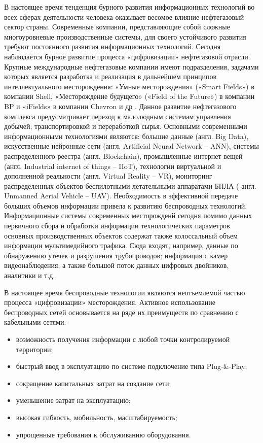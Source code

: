 
{\actuality} 
В настоящее время тенденция бурного развития информационных технологий во всех сферах деятельности человека оказывает весомое влияние нефтегазовый сектор страны. Современные компании, представляющие собой сложные многоуровневые производственные системы, для своего устойчивого развития требуют постоянного развития информационных технологий.  Сегодня наблюдается  бурное развитие процесса «цифровизации» нефтегазовой отрасли. Крупные международные нефтегазовые компании имеют подразделения, задачами которых является разработка и реализация в дальнейшем принципов интеллектуального месторождения: «Умные месторождения» («Smart Fields») в компании Shell, «Месторождение будущего» («Field of the Future») в компании BP и «iFields» в компании Chevron и др \cite{Tcharo2018}. Данное развитие нефтегазового комплекса предусматривает переход к малолюдным системам управления добычей, транспортировкой и переработкой сырья. Основными современными информационными технологиями являются: большие данные (англ. Big Data), искусственные нейронные сети (англ. Artificial Neural Network – ANN), системы распределенного реестра (англ. Blockchain), промышленные интернет вещей (англ. Industrial internet of things – IIoT), технологии виртуальной и дополненной реальности (англ. Virtual Reality – VR), мониторинг распределенных объектов беспилотными летательными аппаратами БПЛА ( англ. Unmanned Aerial Vehicle – UAV). Необходимость в эффективной передаче больших объемов информации привела к развитию беспроводных технологий. Информационные  системы современных месторожденй сегодня помимо данных первичного сбора и обработки информации технологических параметров основных производственных объектов содержат также колоссальный объем информации мультимедийного трафика. Сюда входят, например, данные по обнаружению утечек и разрушения трубопроводов; информация с камер видеонаблюдения; а также большой поток данных цифровых двойников, аналитики и т.д.

В настоящее время беспроводные технологии являются неотъемлемой частью процесса «цифровизации» месторождения. Активное использование беспроводных сетей основывается на ряде их преимуществ по сравнению с кабельными сетями:
\begin{itemize}
    \item возможность получения информации с любой точки контролируемой территории;
    \item быстрый ввод в эксплуатацию по системе подключение типа Plug-\&-Play;
    \item сокращение капитальных затрат на создание сети; 
    \item уменьшение затрат на эксплуатацию;
    \item высокая гибкость, мобильность, масштабируемость;
    \item упрощенные требования к обслуживанию оборудования.
\end{itemize}

